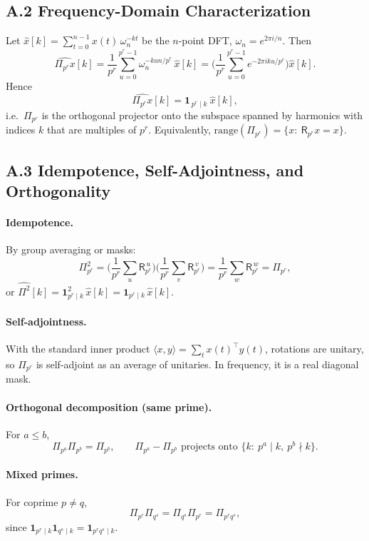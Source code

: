\documentclass[12pt]{article}
\numberwithin{equation}{section}
\theoremstyle{plain}
\theoremstyle{definition}
\theoremstyle{remark}
\begin{document}
\subsection*{A.2 Frequency-Domain Characterization}
Let $\widehat{x}[k]=\sum_{t=0}^{n-1}x(t)\,\omega_n^{-kt}$ be the $n$-point DFT, $\omega_n=e^{2\pi i/n}$. Then
\[
\widehat{\Pi_{p^r}x}[k]
=\frac{1}{p^r}\sum_{u=0}^{p^r-1}\omega_n^{-k u n/p^r}\,\widehat{x}[k]
=\Bigg(\frac{1}{p^r}\sum_{u=0}^{p^r-1}e^{-2\pi i ku/p^r}\Bigg)\widehat{x}[k].
\]
Hence
\[
\widehat{\Pi_{p^r}x}[k]=\mathbf{1}_{\,p^r\mid k}\ \widehat{x}[k],
\]
i.e.\ $\Pi_{p^r}$ is the orthogonal projector onto the subspace spanned by harmonics with indices $k$ that are multiples of $p^r$. Equivalently, $\mathrm{range}(\Pi_{p^r})=\{x:\ \mathsf{R}_{p^r}x=x\}$.

\subsection*{A.3 Idempotence, Self-Adjointness, and Orthogonality}
\paragraph{Idempotence.} By group averaging or masks:
\[
\Pi_{p^r}^2=\Big(\frac{1}{p^r}\sum_{u}\mathsf{R}_{p^r}^{\,u}\Big)\Big(\frac{1}{p^r}\sum_{v}\mathsf{R}_{p^r}^{\,v}\Big)
=\frac{1}{p^r}\sum_{w}\mathsf{R}_{p^r}^{\,w}=\Pi_{p^r},
\]
or $\widehat{\Pi^2}[k]=\mathbf{1}_{p^r\mid k}^2\,\widehat{x}[k]=\mathbf{1}_{p^r\mid k}\,\widehat{x}[k]$.

\paragraph{Self-adjointness.} With the standard inner product $\langle x,y\rangle=\sum_t x(t)^\top y(t)$, rotations are unitary, so $\Pi_{p^r}$ is self-adjoint as an average of unitaries. In frequency, it is a real diagonal mask.

\paragraph{Orthogonal decomposition (same prime).} For $a\le b$,
\[
\Pi_{p^a}\Pi_{p^b}=\Pi_{p^b},\qquad \Pi_{p^a}-\Pi_{p^b} \text{ projects onto } \{k:\ p^a\mid k,\ p^b\nmid k\}.
\]

\paragraph{Mixed primes.} For coprime $p\neq q$,
\[
\Pi_{p^r}\Pi_{q^s}=\Pi_{q^s}\Pi_{p^r}=\Pi_{p^r q^s},
\]
since $\mathbf{1}_{p^r\mid k}\mathbf{1}_{q^s\mid k}=\mathbf{1}_{p^r q^s\mid k}$.
\end{document}
